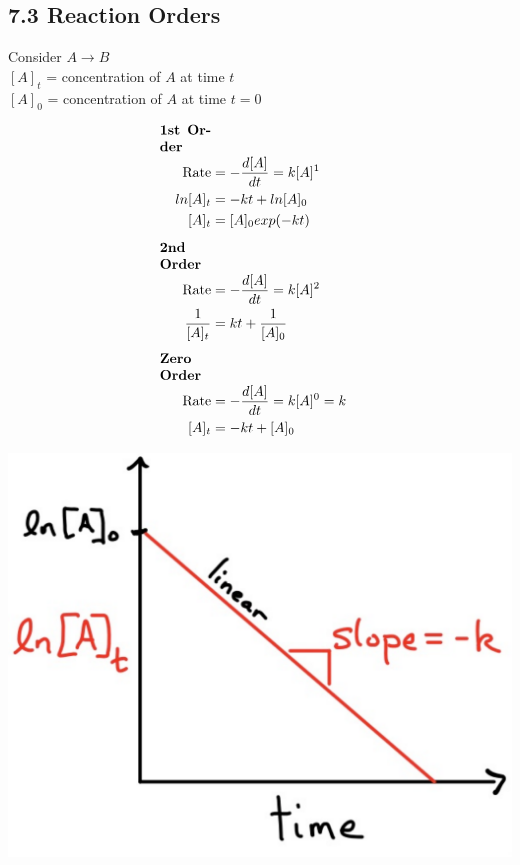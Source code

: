 \subsection{7.3 Reaction Orders}
\vspace*{0.5em}
Consider $A \longrightarrow B$\\
$[A]_t$ = concentration of $A$ at time $t$\\
$[A]_0$ = concentration of $A$ at time $t=0$

\begin{minipage}{0.99\linewidth}
    \begin{minipage}{0.65\linewidth}
        \begin{align*}
            \parbox{1.3cm}{\textbf{1st Order}}\\
            \text{Rate} &= -\frac{d[A]}{d t} = k[A]^1 \\
            ln[A]_t &= -k t + ln[A]_0\\
            [A]_t& = [A]_0 exp(-k t)
            \\[0.5em]
            \parbox{1.3cm}{\textbf{2nd Order}}\\
            \text{Rate} &= -\frac{d[A]}{d t} = k[A]^2 \\
            \frac{1}{[A]_t} &= k t + \frac{1}{[A]_0}
            \\[0.5em]
            \parbox{1.3cm}{\textbf{Zero Order}}\\
            \text{Rate} &= -\frac{d[A]}{d t} = k[A]^0 = k \\
            [A]_t &= -k t + [A]_0 \\
        \end{align*}
    \end{minipage}
    \begin{minipage}{0.34\linewidth}
        \vspace{2.5em}

        \includegraphics[width=0.9\linewidth]{src/7_Kinetics/images/1st_order.pdf}


\end{minipage}
\end{minipage}
